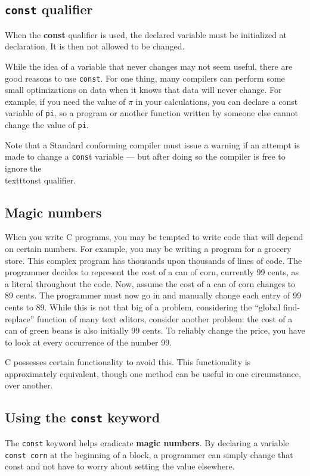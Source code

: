 \subsection{\texttt{const} qualifier}
When the \textbf{const} qualifier is used, the declared variable must be
initialized at declaration. It is then not allowed to be changed.

While the idea of a variable that never changes may not seem useful, there are
good reasons to use \texttt{const}. For one thing, many compilers can perform
some small optimizations on data when it knows that data will never change. For
example, if you need the value of \ensuremath{\pi} in your calculations, you
can declare a const variable of \texttt{pi}, so a program or another function
written by someone else cannot change the value of \texttt{pi}.

Note that a Standard conforming compiler must issue a warning if an attempt is
made to change a \texttt{cons}t variable --- but after doing so the compiler is
free to ignore the \\texttt{onst} qualifier.

\subsection{Magic numbers}
When you write C programs, you may be tempted to write code that will depend on
certain numbers. For example, you may be writing a program for a grocery store.
This complex program has thousands upon thousands of lines of code. The
programmer decides to represent the cost of a can of corn, currently 99 cents,
as a literal throughout the code. Now, assume the cost of a can of corn changes
to 89 cents. The programmer must now go in and manually change each entry of 99
cents to 89. While this is not that big of a problem, considering the ``global
find-replace'' function of many text editors, consider another problem: the
cost of a can of green beans is also initially 99 cents. To reliably change the
price, you have to look at every occurrence of the number 99.

C possesses certain functionality to avoid this. This functionality is
approximately equivalent, though one method can be useful in one circumstance,
over another.

\subsection{Using the \texttt{const} keyword}
The \texttt{const} keyword helps eradicate \textbf{magic numbers}. By declaring
a variable \texttt{const corn} at the beginning of a block, a programmer can
simply change that const and not have to worry about setting the value
elsewhere.

